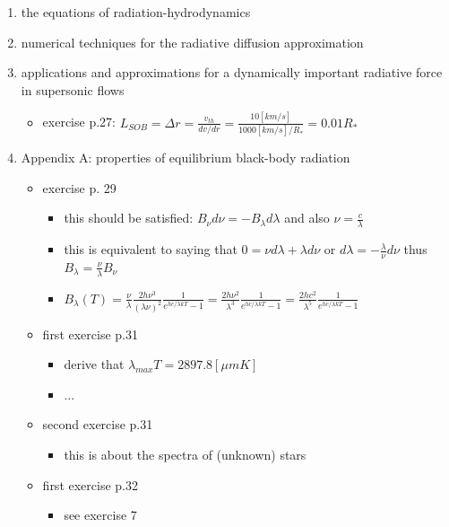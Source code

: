 \documentclass[../main/main.tex]{subfiles}
\begin{document}
\begin{enumerate}
\begin{itemize}
\end{itemize}



\item the equations of radiation-hydrodynamics
\item numerical techniques for the radiative diffusion approximation

\item applications and approximations for a dynamically important radiative force in supersonic flows
\begin{itemize}
\item exercise p.27: $L_{SOB} = \Delta r = \frac{v_{th}}{dv/dr} = \frac{10 [km/s]}{1000 [km/s]/R_{*}} = 0.01 R_{*}$
\end{itemize}

\item Appendix A: properties of equilibrium black-body radiation
\begin{itemize}

\item exercise p. 29
\begin{itemize}
\item this should be satisfied: $B_{\nu} d\nu = -B_{\lambda} d\lambda$ and also $\nu  = \frac{c}{\lambda}$
\item this is equivalent to saying that $0 = \nu d \lambda + \lambda d \nu$ or $d \lambda = - \frac{\lambda}{\nu} d\nu$ thus $B_{\lambda} = \frac{\nu}{\lambda} B_{\nu}$
\item $B_{\lambda}(T) = \frac{\nu}{\lambda} \frac{2h \nu^3}{(\lambda \nu)^2} \frac{1}{e^{h c/ \lambda kT} - 1} = \frac{2h \nu^2}{\lambda^3} \frac{1}{e^{h c/ \lambda kT} - 1} = \frac{2hc^2}{\lambda^5} \frac{1}{e^{h c/ \lambda kT} - 1}$ 
\end{itemize}

\item first exercise p.31
\begin{itemize}
\item derive that $\lambda_{max} T = 2897.8 [\mu m K]$
\item ...
\end{itemize}

\item second exercise p.31
\begin{itemize}
\item this is about the spectra of (unknown) stars
\end{itemize}

\item first exercise p.32
\begin{itemize}
\item see exercise 7
\end{itemize}


\end{itemize}
\end{enumerate}
\end{document}
